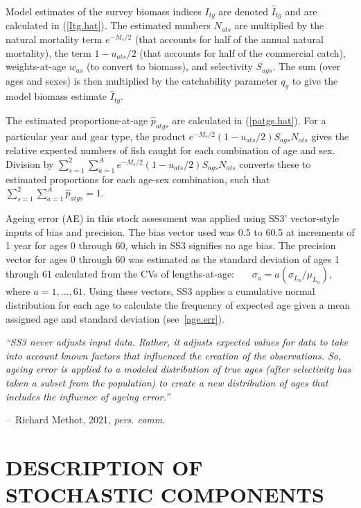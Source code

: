 \documentclass[11pt]{book}
\makeatletter
\newenvironment{chapquote}[2][2em]
  {\setlength{\@tempdima}{#1}%
   \def\chapquote@author{#2}%
   \parshape 1 \@tempdima \dimexpr\textwidth-2\@tempdima\relax%
   \itshape}
  {\par\normalfont\hfill--\ \chapquote@author\hspace*{\@tempdima}\par\smallskip}
\newcommand{\eref}[1]{(\ref{#1})}
\makeatother
\begin{document}
Model estimates of the survey biomass indices $I_{tg}$ are denoted $\widehat{I}_{tg}$ and are calculated in \eref{Itg.hat}.
The estimated numbers $N_{ats}$ are multiplied by the natural mortality term $e^{-M_s / 2}$ (that accounts for half of the annual natural mortality), the term $1 - u_{ats} / 2$ (that accounts for half of the commercial catch),  weights-at-age $w_{as}$ (to convert to biomass), and selectivity $S_{ags}$. 
The sum (over ages and sexes) is then multiplied by the catchability parameter $q_g$ to give the model biomass estimate $\widehat{I}_{tg}$. 

The estimated proportions-at-age $\widehat{p}_{atgs}$ are calculated in \eref{patgs.hat}. 
For a particular year and gear type, the product $e^{-M_{s}/2} (1 - u_{ats}/2) S_{ags} N_{ats}$ gives the relative expected numbers of fish caught for each combination of age and sex. 
Division by $\sum_{s=1}^2 \sum_{a=1}^A e^{-M_{s}/2} (1 - u_{ats}/2) S_{ags} N_{ats}$ converts these to estimated proportions for each age-sex combination, such that $\sum_{s=1}^2 \sum_{a=1}^{A} \widehat{p}_{atgs} = 1$.

Ageing error (AE) in this stock assessment was applied using SS3' vector-style inputs of bias and precision.
The bias vector used was 0.5 to 60.5 at increments of 1 year for ages 0 through 60, which in SS3 signifies no age bias.
The precision vector for ages 0 through 60 was estimated as the standard deviation of ages 1 through 61 calculated from the CVs of lengths-at-age:
~~~$\sigma_a = a (\sigma_{L_a} / \mu_{L_a})$, where $a=1,...,61$.
Using these vectors, SS3 applies a cumulative normal distribution for each age to calculate the frequency of expected age given a mean assigned age and standard deviation (see~\ref{age.err}).

\begin{chapquote}{Richard Methot, 2021, \textit{pers. comm.}}
``SS3 never adjusts input data.  Rather, it adjusts expected values for data to take into account known factors that influenced the creation of the observations. So, ageing error is applied to a modeled distribution of true ages (after selectivity has taken a subset from the population) to create a new distribution of ages that includes the influence of ageing error.''
\end{chapquote}

\section{DESCRIPTION OF STOCHASTIC COMPONENTS}
\end{document}

